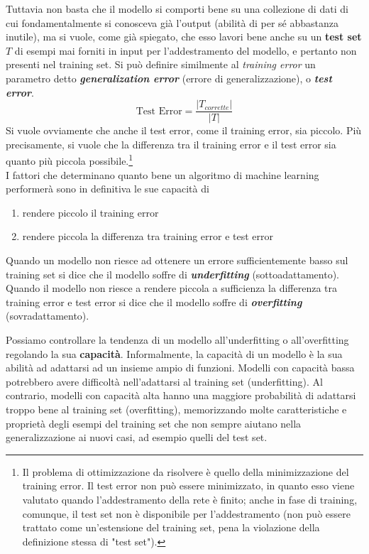 Tuttavia non basta che il modello si comporti bene su una collezione di dati di cui fondamentalmente si conosceva già l'output (abilità di per sé abbastanza inutile), ma si vuole, come già spiegato, che esso lavori bene anche su un \textbf{test set} $T$ di esempi mai forniti in input per l'addestramento del modello, e pertanto non presenti nel training set. Si può definire similmente al \textit{training error} un parametro detto \textbf{\textit{generalization error}} (errore di generalizzazione), o \textbf{\textit{test error}}.
\[\text{Test Error}=\frac{|T_{corrette}|}{|T|}\]
Si vuole ovviamente che anche il test error, come il training error, sia piccolo. Più precisamente, si vuole che la differenza tra il training error e il test error sia quanto più piccola possibile.\footnote{Il problema di ottimizzazione da risolvere è quello della minimizzazione del training error. Il test error non può essere minimizzato, in quanto esso viene valutato quando l'addestramento della rete è finito; anche in fase di training, comunque, il test set non è disponibile per l'addestramento (non può essere trattato come un'estensione del training set, pena la violazione della definizione stessa di "test set").}\\

I fattori che determinano quanto bene un algoritmo di machine learning performerà sono in definitiva le sue capacità di
\begin{enumerate}
\item rendere piccolo il training error
\item rendere piccola la differenza tra training error e test error
\end{enumerate}

Quando un modello non riesce ad ottenere un errore sufficientemente basso sul training set si dice che il modello soffre di \textbf{\textit{underfitting}} (sottoadattamento). Quando il modello non riesce a rendere piccola a sufficienza la differenza tra training error e test error si dice che il modello soffre di \textbf{\textit{overfitting}} (sovradattamento).

Possiamo controllare la tendenza di un modello all'underfitting o all'overfitting  regolando la sua \textbf{capacità}. Informalmente, la capacità di un modello è la sua abilità ad adattarsi ad un insieme ampio di funzioni. Modelli con capacità bassa potrebbero avere difficoltà nell'adattarsi al training set (underfitting). Al contrario, modelli con capacità alta hanno una maggiore probabilità di adattarsi troppo bene al training set (overfitting), memorizzando molte caratteristiche e proprietà degli esempi del training set che non sempre aiutano nella generalizzazione ai nuovi casi, ad esempio quelli del test set.

